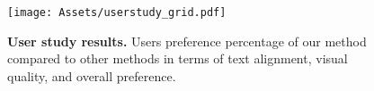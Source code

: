 \begin{figure}[htp]
  \centering
   \texttt{[image: Assets/userstudy\_grid.pdf]}
   
   \caption{\textbf{User study results.} Users preference percentage of our method compared to other methods in terms of text alignment, visual quality, and overall preference.
   }
   \label{fig:user_study}
\end{figure}
